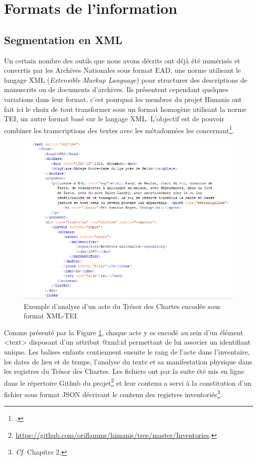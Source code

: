 \documentclass[a4paper,12pt,twoside]{book}
\begin{document}
	\section{Formats de l’information}
	
	\subsection{Segmentation en XML}
	
	Un certain nombre des outils que nous avons décrits ont déjà été numérisés et convertis par les Archives Nationales sous format EAD, une norme utilisant le langage XML (\textit{Extensible Markup Language}) pour structurer des descriptions de manuscrits ou de documents d’archives. Ils présentent cependant quelques variations dans leur format, c'est pourquoi les membres du projet Himanis ont fait ici le choix de tout transformer sous un format homogène utilisant la norme TEI, un autre format basé sur le langage XML. L'objectif est de pouvoir combiner les transcriptions des textes avec les métadonnées les concernant\footcite{stutzmann_recherche_2017}.
	
	\begin{figure}
		\centering
		\includegraphics[width=\textwidth]{Images/Inventaire_en_TEI.png}
		\caption{Exemple d'analyse d'un acte du Trésor des Chartes encodée sous format XML-TEI.}
		\label{inventaire_TEI}
	\end{figure} 
	
	Comme présenté par la Figure \ref{inventaire_TEI}, chaque acte y es encodé au sein d'un élément <text> disposant d'un attribut @xml:id permettant de lui associer un identifiant unique. Les balises enfants contiennent ensuite le rang de l'acte dans l'inventaire, les dates de lieu et de temps, l'analyse du texte et sa manifestation physique dans les registres du Trésor des Chartes. Les fichiers ont par la suite été mis en ligne dans le répertoire Github du projet\footnote{\url{https://github.com/oriflamms/himanis/tree/master/Inventories}.} et leur contenu a servi à la constitution d'un fichier sous format JSON décrivant le contenu des registres inventoriés\footnote{\textit{Cf}. Chapitre 2.}.
	
\end{document}
